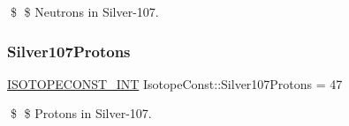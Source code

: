 \$ \$ Neutrons in Silver-\/107. \mbox{\label{group___isotope_const-_silver-_ag107_gac62850ca019dcaee0caa54d03f8ced59}} 
\subsubsection{\texorpdfstring{Silver107\+Protons}{Silver107Protons}}
{\footnotesize\ttfamily \mbox{\hyperlink{group___isotope_const-_macros_ga5f18360b3e99483a35c32d789e62621c}{I\+S\+O\+T\+O\+P\+E\+C\+O\+N\+S\+T\+\_\+\+I\+NT}} Isotope\+Const\+::\+Silver107\+Protons = 47}

\$ \$ Protons in Silver-\/107. 